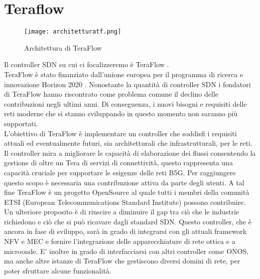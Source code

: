 \chapter{Teraflow}

\begin{figure}[h]
    \centering
   \texttt{[image: architetturatf.png]}
    \caption{Architettura di TeraFlow}
    \label{fig:tfs}
\end{figure}
Il controller SDN su cui ci focalizzeremo è TeraFlow \cite{TeraFlow}. 
\\TeraFlow è stato finanziato dall'unione europea per il programma di ricerca e innovazione Horizon 2020 \cite{Horizon}. 
Nonostante la quantità di controller SDN i fondatori di TeraFlow hanno riscontrato come problema comune il declino delle contribuzioni negli ultimi anni. 
Di conseguenza, i nuovi bisogni e requisiti delle reti moderne che si stanno sviluppando in questo momento non saranno più supportati.
\\L'obiettivo di TeraFlow è implementare un controller che soddisfi i requisiti attuali ed eventualmente futuri, sia architetturali che infrastrutturali, per le reti.
Il controller mira a migliorare le capacità di elaborazione dei flussi consentendo la gestione di oltre un Tera di servizi di connettività, questo rappresenta una capacità cruciale per supportare le esigenze delle reti B5G. 
Per raggiungere questo scopo è necessaria una contribuzione attiva 
da parte degli utenti. A tal fine TeraFlow è un progetto OpenSource 
al quale tutti i membri della comunità ETSI (European Telecommunications Standard Institute) \cite{etsi} possono contribuire. 
\\Un ulteriore proposito è di riuscire a diminuire il gap tra ciò che le industrie richiedono e ciò che si può ricavare dagli standard SDN.
Questo controller, che è ancora in fase di sviluppo, sarà in grado di integrarsi con gli attuali framework NFV e MEC e fornire l'integrazione delle 
apparecchiature di rete ottica e a microonde. E' inoltre in grado di interfacciarsi con altri controller come ONOS, ma anche altre istanze di TeraFlow che gestiscono diversi domini di rete, per poter sfruttare alcune funzionalità.
